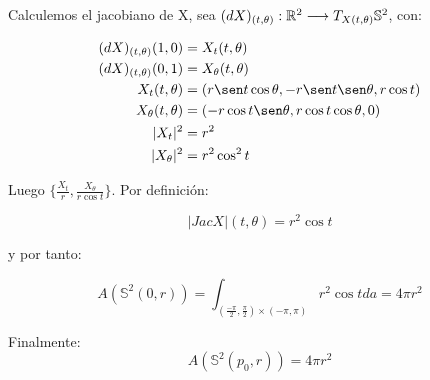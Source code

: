 \begin{remark}
Calculemos el jacobiano de X, sea $(dX)_{(t, \theta)}: \mathbb{R}^2 \longrightarrow T_{X(t,\theta)} \mathbb{S}^2$, con:

\begin{align*}
    (dX)_{(t, \theta)}(1,0) &= X_t(t, \theta) \\
    (dX)_{(t, \theta)}(0,1) &= X_\theta(t, \theta) \\
    X_t(t, \theta) &= (r\sen t\cos\theta, -r\sen t\sen\theta, r\cos t) \\
    X_\theta(t, \theta) &= (-r\cos t\sen\theta, r\cos t\cos\theta, 0) \\
    |X_t|^2 &= r^2 \\
    |X_\theta|^2 &= r^2\cos^2t
\end{align*}

Luego $\{ \frac{X_t}{r}, \frac{X_\theta}{r\cos t} \}$. Por definición:

\begin{equation*}
    |Jac X|(t,\theta) = r^2\cos t
\end{equation*}

y por tanto:

\begin{equation*}
    A(\mathbb{S}^2(0,r)) = \int_{(\frac{-\pi}{2}, \frac{\pi}{2}) \times (-\pi, \pi)} r^2\cos t da = 4\pi r^2 
\end{equation*}

Finalmente:
\begin{equation*}
    A(\mathbb{S}^2(p_0,r)) = 4\pi r^2 
\end{equation*}
\end{remark}

